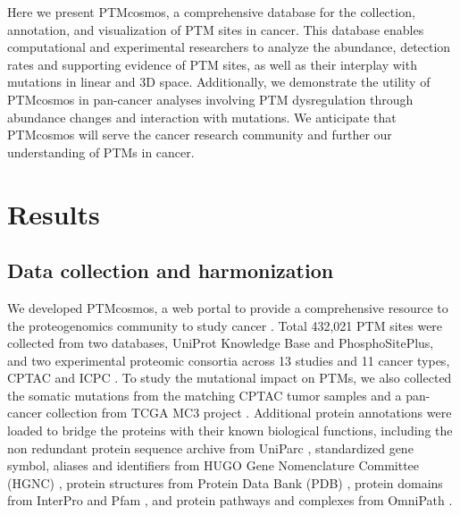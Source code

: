 Here we present PTMcosmos, a comprehensive database for the collection, annotation, and visualization of PTM sites in cancer. This database enables computational and experimental researchers to analyze the abundance, detection rates and supporting evidence of PTM sites, as well as their interplay with mutations in linear and 3D space. Additionally, we demonstrate the utility of PTMcosmos in pan-cancer analyses involving PTM dysregulation through abundance changes and interaction with mutations. We anticipate that PTMcosmos will serve the cancer research community and further our understanding of PTMs in cancer.



\section{Results}

\subsection{Data collection and harmonization}
We developed PTMcosmos, a web portal to provide a comprehensive resource to the proteogenomics community to study cancer . Total 432,021 PTM sites were collected from two databases, UniProt Knowledge Base and PhosphoSitePlus, and two experimental proteomic consortia across 13 studies and 11 cancer types, CPTAC and ICPC . To study the mutational impact on PTMs, we also collected the somatic mutations from the matching CPTAC tumor samples and a pan-cancer collection from TCGA MC3 project \cite{ellrottk_tcga:MC3MutationCalling2018}. Additional protein annotations were loaded to bridge the proteins with their known biological functions, including the non redundant protein sequence archive from UniParc \cite{leinonenr_apweilerr:UniProtArchive2004}, standardized gene symbol, aliases and identifiers from HUGO Gene Nomenclature Committee (HGNC) \cite{brufordea_tweedies:GuidelinesHuman2020}, protein structures from Protein Data Bank (PDB) \cite{bermanhm_bournepe:ProteinData2000}, protein domains from InterPro \cite{blumm_finnrd:InterProProtein2021} and Pfam \cite{mistryj_batemana:PfamProtein2021}, and protein pathways and complexes from OmniPath \cite{tureid_saez-rodriguezj:OmniPathGuidelines2016}.

